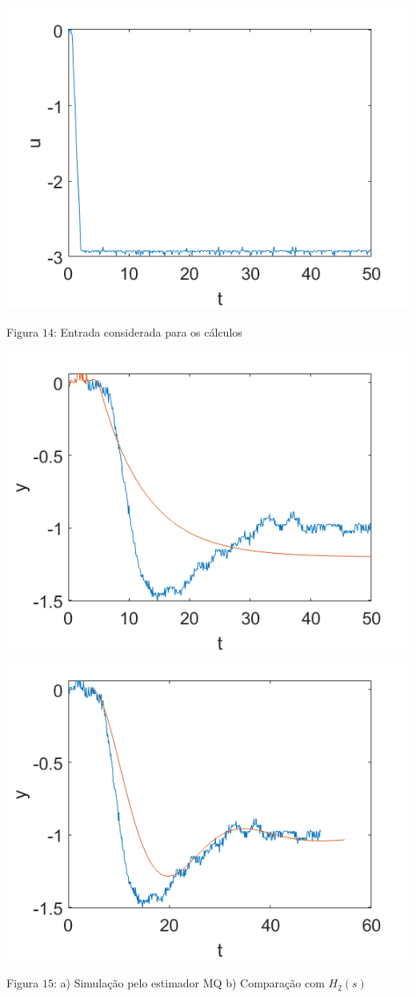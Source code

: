 \documentclass{rbfin}
\begin{document}
\begin{center}
\includegraphics[scale=0.65]{44_3}

Figura $14$: Entrada considerada para os cálculos
\end{center}

\begin{center}
\includegraphics[scale=0.5]{44_4}
\includegraphics[scale=0.5]{44_5}

Figura $15$: a) Simulação pelo estimador MQ b) Comparação com $H_2(s)$
\end{center}
\end{document}
